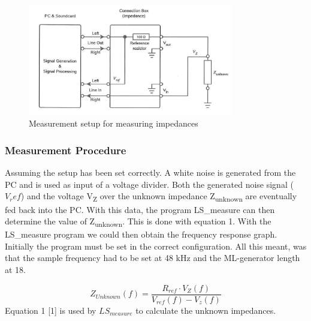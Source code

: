 \documentclass{article}
\begin{document}
\begin{figure}[H]
  \centering
  \includegraphics[width=0.8\textwidth]{Figures/setup_elec_cropped.pdf}
  \caption{Measurement setup for measuring impedances}
  \label{fig:setupelec}
\end{figure}

\subsubsection{Measurement Procedure}
Assuming the setup has been set correctly. A white noise is generated from the PC and is used as input of a voltage divider. Both the generated noise signal ($V_ref$) and the voltage V\textsubscript{Z} over the unknown impedance Z\textsubscript{unknown} are eventually fed back into the PC. With this data, the program LS\_measure can then determine the value of Z\textsubscript{unknown}. This is done with equation 1. With the LS\_measure program we could then obtain the frequency response graph. Initially the program must be set in the correct configuration. All this meant, was that the sample frequency had to be set at 48 kHz and the ML-generator length at 18. 

\begin{equation}
 Z_{Unknown}(f)= \frac{R_{ref} \cdot V_{Z}(f)}{V_{ref}(f) - V_{z}(f)} 
\end{equation}
\indent
Equation 1 [1] is used by $LS_{measure}$ to calculate the unknown impedances.
\end{document}
